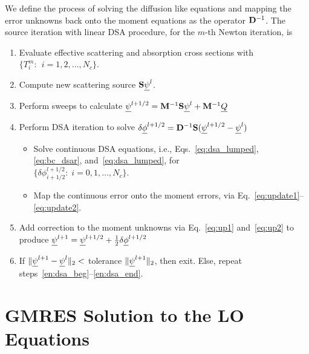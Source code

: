 We define the process of solving the diffusion like equations and mapping the error
unknowns back onto the moment equations as the operator $\mathbf{D}^{-1}$.
The source iteration with linear DSA procedure, for the $m$-th Newton iteration, is
\begin{enumerate}
    \item Evaluate effective scattering and absorption cross sections with
        ${\{T^m_i:\;\, i=1,2,\ldots,N_c\}}$.
    \item\label{en:dsa_beg} Compute new scattering source $\mathbf{S} \underline{\psi}^l$.
    \item Perform sweeps to calculate $\underline{\psi}^{l+1/2} = \mathbf{M}^{-1} \mathbf{S} \underline{\psi}^{l} + \mathbf{M}^{-1} \underline{Q}$
    \item Perform DSA iteration to solve $ \delta \underline{\phi}^{l+1/2} = \mathbf{D}^{-1}
        \mathbf{S}(\underline{\psi}^{l+1/2}-\underline{\psi}^l)$
        \begin{itemize}
    \item Solve continuous DSA equations, i.e., Eqs.~\eqref{eq:dsa_lumped}, \eqref{eq:bc_dsar},
and~\eqref{eq:dsa_lumped}, for \\${\{\delta
            \phi^{l+1/2}_{i+1/2}:\;i=0,1,\ldots,N_c\}}$.
        \item Map the continuous error onto the moment errors, via
            Eq.~\eqref{eq:update1}--\eqref{eq:update2}.
    \end{itemize}
\item Add correction to the moment unknowns via Eq.~\eqref{eq:up1} and~\eqref{eq:up2} to produce $\underline{\psi}^{l+1} = \underline{\psi}^{l+1/2} + \frac{1}{2}\delta \underline{\phi}^{l+1/2}$
    \item\label{en:dsa_end} If $\|\underline{\psi}^{l+1} - \underline{\psi}^{l} \|_2 < $ tolerance $\|\underline{\psi}^{l+1} \|_2$, then
        exit. Else, repeat steps~\ref{en:dsa_beg}--\ref{en:dsa_end}.
\end{enumerate}

\section{GMRES Solution to the LO Equations}

